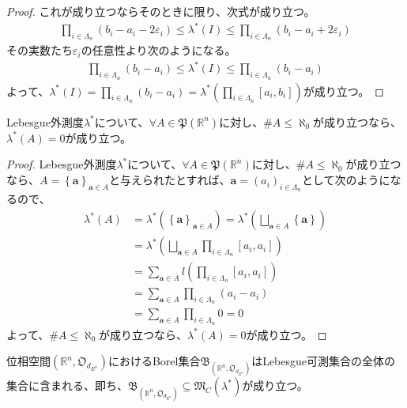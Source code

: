 \documentclass[dvipdfmx]{jsarticle}
\begin{document}
\begin{proof}
これが成り立つならそのときに限り、次式が成り立つ。
\begin{align*}
\prod_{i \in \varLambda_{n}} \left( b_{i} - a_{i} - 2\varepsilon_{i} \right) \leq \lambda^{*}(I) \leq \prod_{i \in \varLambda_{n}} \left( b_{i} - a_{i} + 2\varepsilon_{i} \right)
\end{align*}
その実数たち$\varepsilon_{i}$の任意性より次のようになる。
\begin{align*}
\prod_{i \in \varLambda_{n}} \left( b_{i} - a_{i} \right) \leq \lambda^{*}(I) \leq \prod_{i \in \varLambda_{n}} \left( b_{i} - a_{i} \right)
\end{align*}
よって、$\lambda^{*}(I) = \prod_{i \in \varLambda_{n}} \left( b_{i} - a_{i} \right) = \lambda^{*}\left( \prod_{i \in \varLambda_{n}} \left[ a_{i},b_{i} \right] \right)$が成り立つ。
\end{proof}
\begin{thm}\label{4.5.4.10}
Lebesgue外測度$\lambda^{*}$について、$\forall A \in \mathfrak{P}\left( \mathbb{R}^{n} \right)$に対し、$\#A \leq \aleph_{0}$が成り立つなら、$\lambda^{*}(A) = 0$が成り立つ。
\end{thm}
\begin{proof}
Lebesgue外測度$\lambda^{*}$について、$\forall A \in \mathfrak{P}\left( \mathbb{R}^{n} \right)$に対し、$\#A \leq \aleph_{0}$が成り立つなら、$A = \left\{ \mathbf{a} \right\}_{\mathbf{a} \in A}$と与えられたとすれば、$\mathbf{a} = \left( a_{i} \right)_{i \in \varLambda_{n}}$として次のようになるので、
\begin{align*}
\lambda^{*}(A) &= \lambda^{*}\left( \left\{ \mathbf{a} \right\}_{\mathbf{a} \in A} \right) = \lambda^{*}\left( \bigsqcup_{\mathbf{a} \in A} \left\{ \mathbf{a} \right\} \right)\\
&= \lambda^{*}\left( \bigsqcup_{\mathbf{a} \in A} {\prod_{i \in \varLambda_{n}} \left[ a_{i},a_{i} \right]} \right)\\
&= \sum_{\mathbf{a} \in A} {l\left( \prod_{i \in \varLambda_{n}} \left[ a_{i},a_{i} \right] \right)}\\
&= \sum_{\mathbf{a} \in A} {\prod_{i \in \varLambda_{n}} \left( a_{i} - a_{i} \right)}\\
&= \sum_{\mathbf{a} \in A} {\prod_{i \in \varLambda_{n}} 0} = 0
\end{align*}
よって、$\#A \leq \aleph_{0}$が成り立つなら、$\lambda^{*}(A) = 0$が成り立つ。
\end{proof}
\begin{thm}\label{4.5.4.11}
位相空間$\left( \mathbb{R}^{n},\mathfrak{O}_{d_{E^{n}}} \right)$におけるBorel集合$\mathfrak{B}_{\left( \mathbb{R}^{n},\mathfrak{O}_{d_{E^{n}}} \right)}$はLebesgue可測集合の全体の集合に含まれる、即ち、$\mathfrak{B}_{\left( \mathbb{R}^{n},\mathfrak{O}_{d_{E^{n}}} \right)} \subseteq \mathfrak{M}_{C}\left( \lambda^{*} \right)$が成り立つ。
\end{thm}
\end{document}
